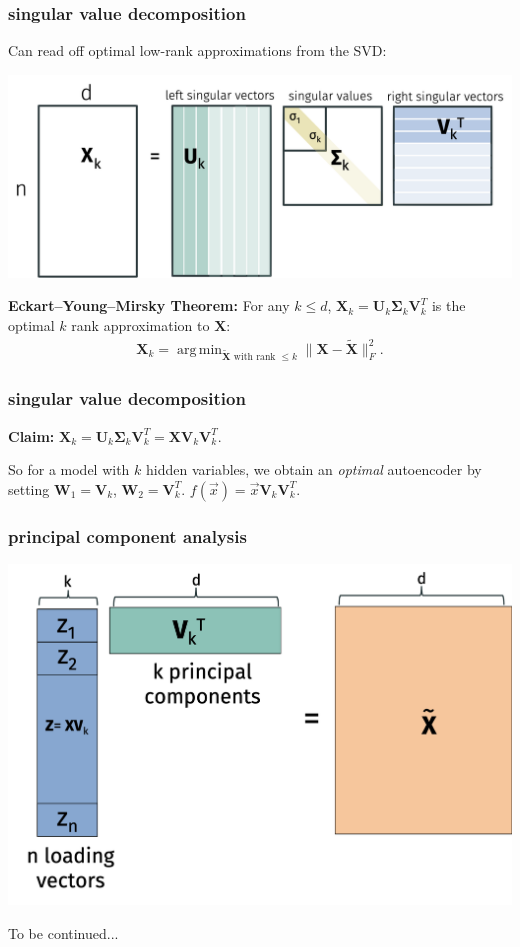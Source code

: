 \documentclass[handout,compress]{beamer}
\newcommand{\bs}[1]{\boldsymbol{#1}}
\newcommand{\bv}[1]{\mathbf{#1}}
\DeclareMathOperator*{\argmin}{arg\,min}
\begin{document}
\begin{frame}[t]
	\frametitle{singular value decomposition}
	Can read off optimal low-rank approximations from the SVD:
	\begin{center}
		\includegraphics[width=.9\textwidth]{svdk.png}
	\end{center} 
	\textbf{Eckart–Young–Mirsky Theorem:} For any $k \leq d$, $\bv{X}_k = \bv{U}_k\bs{\Sigma}_k\bv{V}_k^T$ is the optimal $k$ rank approximation to $\bv{X}$:
	\begin{align*}
	\bv{X}_k = 	\argmin_{\tilde{\bv{X}} \text{ with rank $\leq k$} } \|\bv{X} - \tilde{\bv{X}}\|_F^2.
	\end{align*}
\end{frame}

\begin{frame}[t]
	\frametitle{singular value decomposition}
	\textbf{Claim:} $\bv{X}_k = \bv{U}_k\bs{\Sigma}_k\bv{V}_k^T = \bv{X}\bv{V}_k\bv{V}_k^T$.
	\vspace{15em}
	
	So for a model with $k$ hidden variables, we obtain an \emph{optimal} autoencoder by setting $\bv{W}_1 =\bv{V}_k$, $\bv{W}_2 = \bv{V}_k^T$. $f(\vec{x}) = \vec{x}\bv{V}_k\bv{V}_k^T$.
\end{frame}

\begin{frame}[t]
	\frametitle{principal component analysis}
	\begin{center}
		\includegraphics[width=.9\textwidth]{pca.png}
	\end{center} 
	
	To be continued...
\end{frame}
\end{document}
